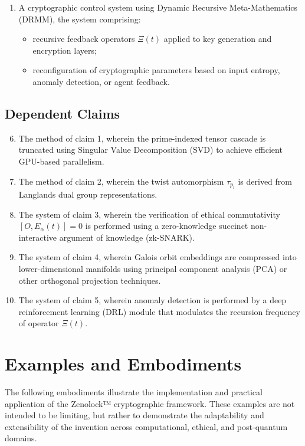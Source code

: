 \documentclass{article}
\theoremstyle{plain}
\begin{document}
\begin{enumerate}
  \item A cryptographic control system using Dynamic Recursive Meta-Mathematics (DRMM), the system comprising:
  \begin{itemize}
    \item recursive feedback operators $\Xi(t)$ applied to key generation and encryption layers;
    \item reconfiguration of cryptographic parameters based on input entropy, anomaly detection, or agent feedback.
  \end{itemize}
\end{enumerate}

\subsection{Dependent Claims}

\begin{enumerate}
  \setcounter{enumi}{5}
  \item The method of claim 1, wherein the prime-indexed tensor cascade is truncated using Singular Value Decomposition (SVD) to achieve efficient GPU-based parallelism.

  \item The method of claim 2, wherein the twist automorphism $\tau_{p_i}$ is derived from Langlands dual group representations.

  \item The system of claim 3, wherein the verification of ethical commutativity $[O, E_\alpha(t)] = 0$ is performed using a zero-knowledge succinct non-interactive argument of knowledge (zk-SNARK).

  \item The system of claim 4, wherein Galois orbit embeddings are compressed into lower-dimensional manifolds using principal component analysis (PCA) or other orthogonal projection techniques.

  \item The system of claim 5, wherein anomaly detection is performed by a deep reinforcement learning (DRL) module that modulates the recursion frequency of operator $\Xi(t)$.
\end{enumerate}

\section{Examples and Embodiments}

The following embodiments illustrate the implementation and practical application of the Zenolock™ cryptographic framework. These examples are not intended to be limiting, but rather to demonstrate the adaptability and extensibility of the invention across computational, ethical, and post-quantum domains.
\end{document}
